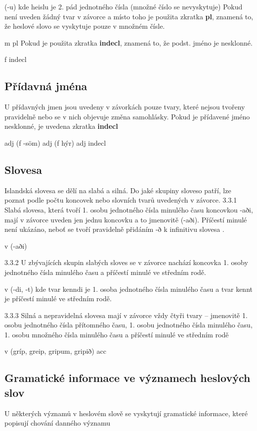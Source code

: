  {\small{ (-u)}}
kde heislu je 2. pád jednotného čísla (množné číslo se nevyskytuje)
 Pokud není uveden žádný tvar v závorce a místo toho je použita zkratka \textbf{pl}, znamená to, že heslové slovo se vyskytuje pouze v množném čísle. 


 {\small{ m pl}}
Pokud je použita zkratka \textbf{indecl}, znamená to, že podst. jméno je nesklonné.


 {\small{ f indecl}}

\subsection{Přídavná jména}
U přídavných jmen jsou uvedeny v závorkách pouze tvary, které nejsou tvořeny pravidelně nebo se v nich objevuje změna samohlásky. Pokud je přídavené jméno nesklonné, je uvedena zkratka \textbf{indecl}


 {\small{ adj (f -söm)}}
 {\small{adj (f hýr)}}
 {\small{ adj indecl}}

\subsection{Slovesa}
Islandská slovesa se dělí na slabá a silná. Do jaké skupiny sloveso patří, lze poznat podle počtu koncovek nebo slovních tvarů uvedených v závorce.
3.3.1 Slabá slovesa, která tvoří 1. osobu jednotného čísla minulého času koncovkou -aði, mají v závorce uveden jen jednu koncovku a to jmenovitě (-aði). Příčestí minulé není ukázáno, neboť se tvoří pravidelně přidáním -ð k infinitivu slovesa .


 {\small{ v (-aði)}}

3.3.2 U zbývajících skupin slabých sloves se v závorce nachází koncovka  1. osoby jednotného čísla minulého času a příčestí minulé ve středním rodě.


 {\small{ v (-di, -t) }}
kde tvar kenndi je 1. osoba jednotného čísla minulého času a tvar kennt je příčestí minulé ve středním rodě. 

3.3.3 Silná a nepravidelná slovesa mají v závorce vždy čtyři tvary – jmenovitě 1. osobu jednotného čísla přítomného času, 1. osobu jednotného čísla minulého času, 1. osobu množného čísla minulého času a příčestí minulé ve středním rodě


 {\small{ v (gríp, greip, gripum, gripið) acc}}

\subsection{Gramatické informace ve významech heslových slov}
U některých významů v heslovém slově se vyskytují gramatické informace, které popisují chování danného významu


